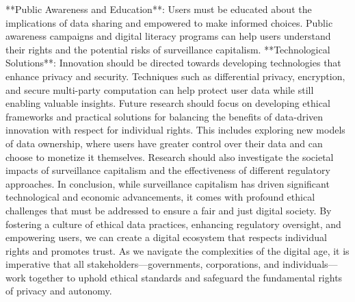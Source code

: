 **Public Awareness and Education**: Users must be educated about the implications of data sharing and empowered to make informed choices.
Public awareness campaigns and digital literacy programs can help users understand their rights and the potential risks of surveillance capitalism.
**Technological Solutions**: Innovation should be directed towards developing technologies that enhance privacy and security.
Techniques such as differential privacy, encryption, and secure multi-party computation can help protect user data while still enabling valuable insights.
Future research should focus on developing ethical frameworks and practical solutions for balancing the benefits of data-driven innovation with respect for individual rights.
This includes exploring new models of data ownership, where users have greater control over their data and can choose to monetize it themselves.
Research should also investigate the societal impacts of surveillance capitalism and the effectiveness of different regulatory approaches.
In conclusion, while surveillance capitalism has driven significant technological and economic advancements, it comes with profound ethical challenges that must be addressed to ensure a fair and just digital society.
By fostering a culture of ethical data practices, enhancing regulatory oversight, and empowering users, we can create a digital ecosystem that respects individual rights and promotes trust.
As we navigate the complexities of the digital age, it is imperative that all stakeholders—governments, corporations, and individuals—work together to uphold ethical standards and safeguard the fundamental rights of privacy and autonomy.
\noindent

